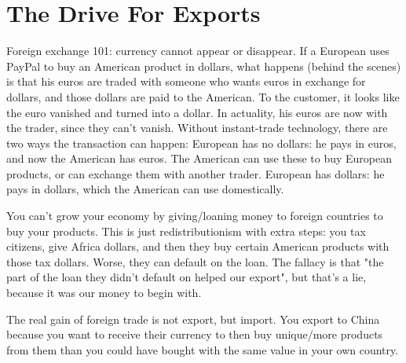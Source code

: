 \section{The Drive For Exports}
\begin{outline}
\1 Foreign exchange 101: currency cannot appear or disappear.
	\2 If a European uses PayPal to buy an American product in dollars, what happens (behind the scenes) is that his euros are traded with someone who wants euros in exchange for dollars, and those dollars are paid to the American.
		\3 To the customer, it looks like the euro vanished and turned into a dollar.
		\3 In actuality, his euros are now with the trader, since they can't vanish.
	\2 Without instant-trade technology, there are two ways the transaction can happen:
		\3 European has no dollars: he pays in euros, and now the American has euros. The American can use these to buy European products, or can exchange them with another trader.
		\3 European has dollars: he pays in dollars, which the American can use domestically.

\1 You can't grow your economy by giving/loaning money to foreign countries to buy your products.
	\2 This is just redistributionism with extra steps: you tax citizens, give Africa dollars, and then they buy certain American products with those tax dollars.
	\2 Worse, they can default on the loan.
		\3 The fallacy is that "the part of the loan they didn't default on helped our export", but that's a lie, because it was our money to begin with.

\1 The real gain of foreign trade is not export, but import.
	\2 You export to China because you want to receive their currency to then buy unique/more products from them than you could have bought with the same value in your own country.
\end{outline}